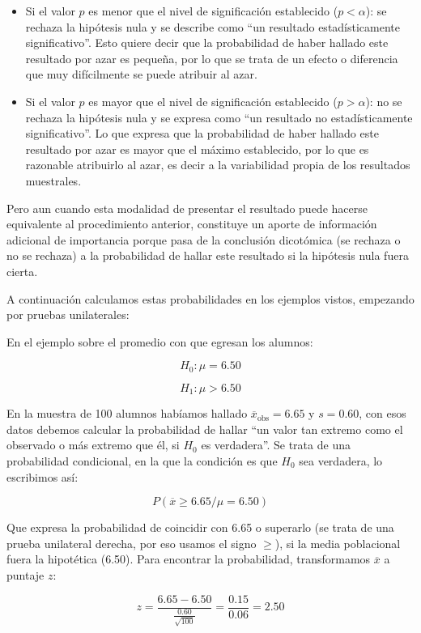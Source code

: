 \documentclass[]{book}
\begin{document}
\begin{itemize}
\item
  Si el valor \(p\) es menor que el nivel de significación establecido
  (\(p<\alpha\)): se rechaza la hipótesis nula y se describe como ``un
  resultado estadísticamente significativo''. Esto quiere decir que la
  probabilidad de haber hallado este resultado por azar es pequeña, por lo
  que se trata de un efecto o diferencia que muy difícilmente se puede
  atribuir al azar.
\item
  Si el valor \(p\) es mayor que el nivel de significación establecido
  (\(p>\alpha\)): no se rechaza la hipótesis nula y se expresa como ``un
  resultado no estadísticamente significativo''. Lo que expresa que la
  probabilidad de haber hallado este resultado por azar es mayor que el
  máximo establecido, por lo que es razonable atribuirlo al azar, es decir a la variabilidad propia de los resultados muestrales.
\end{itemize}

Pero aun cuando esta modalidad de presentar el resultado puede hacerse
equivalente al procedimiento anterior, constituye un aporte de
información adicional de importancia porque pasa de la conclusión
dicotómica (se rechaza o no se rechaza) a la probabilidad de hallar este resultado si la hipótesis nula fuera cierta.

A continuación calculamos estas probabilidades en los ejemplos vistos,
empezando por pruebas unilaterales:

En el ejemplo sobre el promedio con que egresan los alumnos:

\[H_{0}:\mu = 6.50\]

\[H_{1}:\mu > 6.50\]

En la muestra de 100 alumnos habíamos hallado
\({\overline{x}}_{\text{obs}} = 6.65\) y \(s = 0.60\), con esos datos
debemos calcular la probabilidad de hallar ``un valor tan extremo como el
observado o más extremo que él, si \(H_{0}\) es verdadera''. Se trata de una
probabilidad condicional, en la que la condición es que \(H_{0}\) sea
verdadera, lo escribimos así:

\[P\left( \overline{x} \geq 6.65/\mu = 6.50 \right)\]

Que expresa la probabilidad de coincidir con 6.65 o superarlo (se trata
de una prueba unilateral derecha, por eso usamos el signo \(\geq\)), si la
media poblacional fuera la hipotética (6.50). Para encontrar la
probabilidad, transformamos \(\overline{x}\) a puntaje \(z\):

\[z = \frac{6.65 - 6.50}{\frac{0.60}{\sqrt{100}}} = \frac{0.15}{0.06} = 2.50\]
\end{document}
